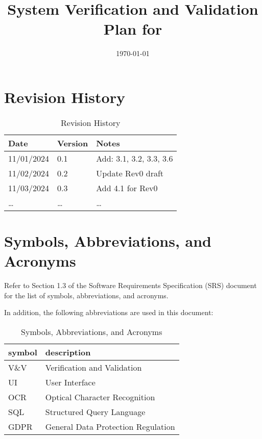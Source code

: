 \documentclass[12pt, titlepage]{article}
\begin{document}
\title{System Verification and Validation Plan for \progname{}} 
\author{\authname}
\date{\today}
	
\maketitle


\section*{Revision History}

\begin{table}[h!]
\caption{Revision History}
\begin{tabularx}{\textwidth}{p{3cm}p{2cm}X}
\toprule {\bf Date} & {\bf Version} & {\bf Notes}\\
\midrule
11/01/2024 & 0.1 & Add: 3.1, 3.2, 3.3, 3.6\\
11/02/2024 & 0.2 & Update Rev0 draft\\
11/03/2024 & 0.3 & Add 4.1 for Rev0\\
\ldots & \ldots & \ldots\\
\bottomrule
\end{tabularx}
\end{table}

\newpage

\tableofcontents

\newpage

\section{Symbols, Abbreviations, and Acronyms}

Refer to Section 1.3 of the Software Requirements Specification (SRS) document
for the list of symbols, abbreviations, and acronyms.

In addition, the following abbreviations are used in this document:\\

\renewcommand{\arraystretch}{1.2}
\begin{table}[h!]
\caption{Symbols, Abbreviations, and Acronyms}
\begin{tabularx}{\textwidth}{l l}
  \toprule		
  \textbf{symbol} & \textbf{description}\\
  \midrule 
  V\&V & Verification and Validation\\
  UI & User Interface\\
  OCR & Optical Character Recognition\\
  SQL & Structured Query Language\\
  GDPR & General Data Protection Regulation\\
  \bottomrule
\end{tabularx}
\end{table}
\end{document}
